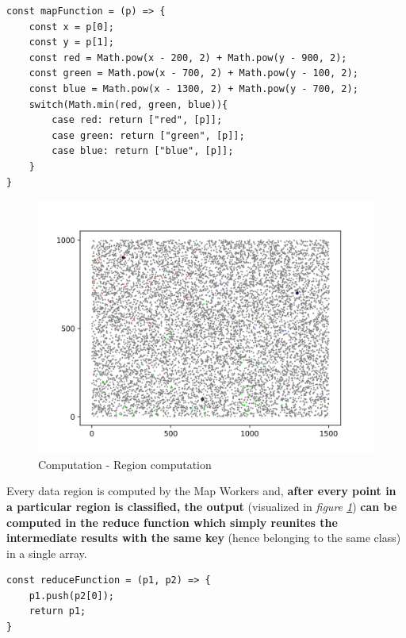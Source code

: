 \begin{lstlisting}[caption={Map function},captionpos=b]
const mapFunction = (p) => {
    const x = p[0];
    const y = p[1];
    const red = Math.pow(x - 200, 2) + Math.pow(y - 900, 2);
    const green = Math.pow(x - 700, 2) + Math.pow(y - 100, 2);
    const blue = Math.pow(x - 1300, 2) + Math.pow(y - 700, 2);
    switch(Math.min(red, green, blue)){
        case red: return ["red", [p]];
        case green: return ["green", [p]];
        case blue: return ["blue", [p]];
    }
}
\end{lstlisting}

\begin{figure}[!ht]
    \centering
    \includegraphics[scale=0.9]{document/chapters/chapter_6/images/computation_region_computation.png}
    \caption{Computation - Region computation}
    \label{fig:computation_region_computation}
\end{figure}

Every data region is computed by the Map Workers and, \textbf{after every point in a particular region is classified, the output} (visualized in \textit{figure \ref{fig:computation_region_computation}}) \textbf{can be computed in the reduce function which simply reunites the intermediate results with the same key} (hence belonging to the same class) in a single array.

\begin{lstlisting}[caption={Reduce function},captionpos=b]
const reduceFunction = (p1, p2) => {
    p1.push(p2[0]);
    return p1;
}
\end{lstlisting}

